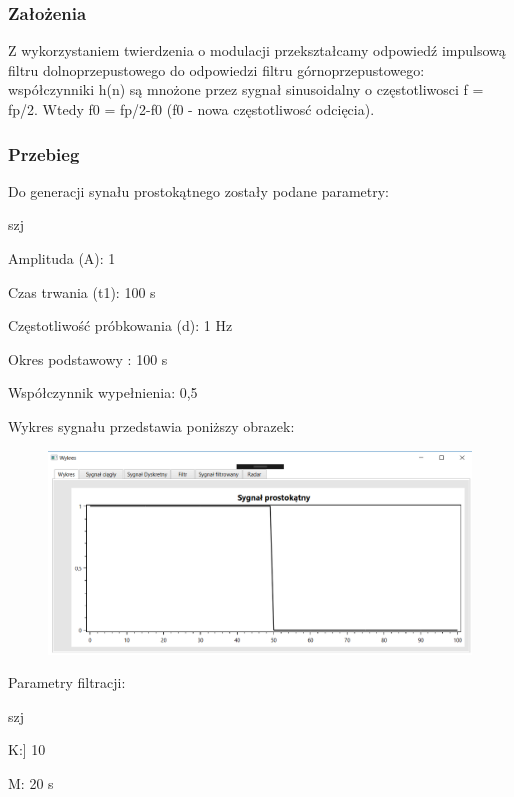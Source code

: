 \documentclass[12pt]{article}
\begin{document}
\subsubsection{Założenia}
Z wykorzystaniem twierdzenia o modulacji przekształcamy odpowiedź impulsową filtru dolnoprzepustowego do odpowiedzi filtru górnoprzepustowego:
współczynniki h(n) są mnożone przez sygnał sinusoidalny  o częstotliwosci f = fp/2. Wtedy f0 = fp/2-f0 (f0 -  nowa częstotliwosć odcięcia).

\subsubsection{Przebieg}
Do generacji synału prostokątnego zostały podane parametry:

\begin{labeling}{szj}
\item [Amplituda (A):] 1
\item [Czas trwania (t1):] 100 s
\item [Częstotliwość próbkowania (d): ] 1 Hz
\item [Okres podstawowy :] 100 s
\item [Współczynnik wypełnienia:] 0,5
\end{labeling}

Wykres sygnału przedstawia poniższy obrazek:
\begin{figure}[h!]
 \centering
 \includegraphics[width=12.3cm]{prost.PNG}
 \vspace{-0.3cm}
 \label{gw}
\end{figure}

Parametry filtracji:

\begin{labeling}{szj}
\item K:] 10
\item [M:] 20 s
\end{labeling}
\end{document}
